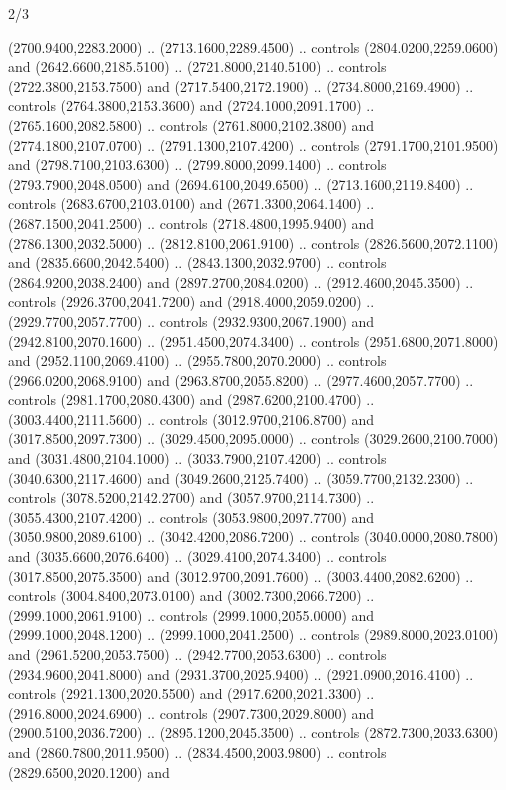 \begin{flagdescription}{2/3}
\begin{scope}[shift={(0.5\flaglength,0.5)},scale=\flagwidth/130]
\begin{scope}[y=0.01mm, x=0.01mm,shift={(-3365,-2250)}]
  (2700.9400,2283.2000) .. (2713.1600,2289.4500) .. controls
  (2804.0200,2259.0600) and (2642.6600,2185.5100) .. (2721.8000,2140.5100) ..
  controls (2722.3800,2153.7500) and (2717.5400,2172.1900) ..
  (2734.8000,2169.4900) .. controls (2764.3800,2153.3600) and
  (2724.1000,2091.1700) .. (2765.1600,2082.5800) .. controls
  (2761.8000,2102.3800) and (2774.1800,2107.0700) .. (2791.1300,2107.4200) ..
  controls (2791.1700,2101.9500) and (2798.7100,2103.6300) ..
  (2799.8000,2099.1400) .. controls (2793.7900,2048.0500) and
  (2694.6100,2049.6500) .. (2713.1600,2119.8400) .. controls
  (2683.6700,2103.0100) and (2671.3300,2064.1400) .. (2687.1500,2041.2500) ..
  controls (2718.4800,1995.9400) and (2786.1300,2032.5000) ..
  (2812.8100,2061.9100) .. controls (2826.5600,2072.1100) and
  (2835.6600,2042.5400) .. (2843.1300,2032.9700) .. controls
  (2864.9200,2038.2400) and (2897.2700,2084.0200) .. (2912.4600,2045.3500) ..
  controls (2926.3700,2041.7200) and (2918.4000,2059.0200) ..
  (2929.7700,2057.7700) .. controls (2932.9300,2067.1900) and
  (2942.8100,2070.1600) .. (2951.4500,2074.3400) .. controls
  (2951.6800,2071.8000) and (2952.1100,2069.4100) .. (2955.7800,2070.2000) ..
  controls (2966.0200,2068.9100) and (2963.8700,2055.8200) ..
  (2977.4600,2057.7700) .. controls (2981.1700,2080.4300) and
  (2987.6200,2100.4700) .. (3003.4400,2111.5600) .. controls
  (3012.9700,2106.8700) and (3017.8500,2097.7300) .. (3029.4500,2095.0000) ..
  controls (3029.2600,2100.7000) and (3031.4800,2104.1000) ..
  (3033.7900,2107.4200) .. controls (3040.6300,2117.4600) and
  (3049.2600,2125.7400) .. (3059.7700,2132.2300) .. controls
  (3078.5200,2142.2700) and (3057.9700,2114.7300) .. (3055.4300,2107.4200) ..
  controls (3053.9800,2097.7700) and (3050.9800,2089.6100) ..
  (3042.4200,2086.7200) .. controls (3040.0000,2080.7800) and
  (3035.6600,2076.6400) .. (3029.4100,2074.3400) .. controls
  (3017.8500,2075.3500) and (3012.9700,2091.7600) .. (3003.4400,2082.6200) ..
  controls (3004.8400,2073.0100) and (3002.7300,2066.7200) ..
  (2999.1000,2061.9100) .. controls (2999.1000,2055.0000) and
  (2999.1000,2048.1200) .. (2999.1000,2041.2500) .. controls
  (2989.8000,2023.0100) and (2961.5200,2053.7500) .. (2942.7700,2053.6300) ..
  controls (2934.9600,2041.8000) and (2931.3700,2025.9400) ..
  (2921.0900,2016.4100) .. controls (2921.1300,2020.5500) and
  (2917.6200,2021.3300) .. (2916.8000,2024.6900) .. controls
  (2907.7300,2029.8000) and (2900.5100,2036.7200) .. (2895.1200,2045.3500) ..
  controls (2872.7300,2033.6300) and (2860.7800,2011.9500) ..
  (2834.4500,2003.9800) .. controls (2829.6500,2020.1200) and

\end{scope}
\end{scope}
\end{flagdescription}
